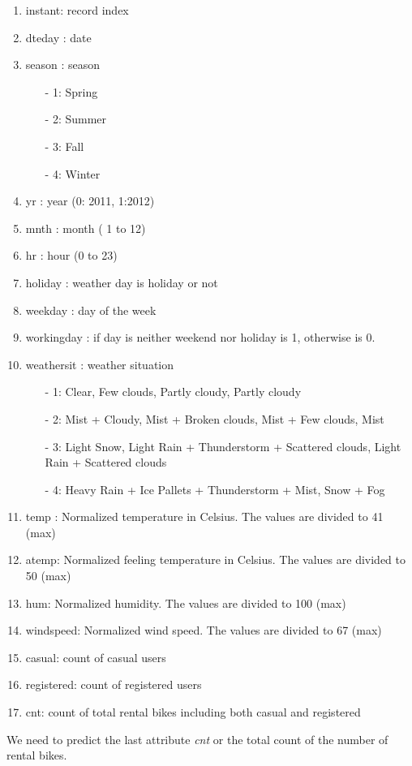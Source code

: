 \documentclass{article}
\begin{document}
\begin{enumerate}
    \item instant: record index
	\item dteday : date
    \item season : season 
        \begin{itemize}
            \item[-] 1: Spring
            \item[-] 2: Summer
            \item[-] 3: Fall 
            \item[-] 4: Winter 
        \end{itemize}
    \item yr : year (0: 2011, 1:2012)
	\item mnth : month ( 1 to 12)
	\item hr : hour (0 to 23)
	\item holiday : weather day is holiday or not 
	\item weekday : day of the week
	\item workingday : if day is neither weekend nor holiday is 1, otherwise is 0.
	\item weathersit : weather situation
	\begin{itemize}
		\item[-] 1: Clear, Few clouds, Partly cloudy, Partly cloudy
		\item[-] 2: Mist + Cloudy, Mist + Broken clouds, Mist + Few clouds, Mist
		\item[-] 3: Light Snow, Light Rain + Thunderstorm + Scattered clouds, Light Rain + Scattered clouds
		\item[-] 4: Heavy Rain + Ice Pallets + Thunderstorm + Mist, Snow + Fog
	\end{itemize}
	\item temp : Normalized temperature in Celsius. The values are divided to 41 (max)
	\item atemp: Normalized feeling temperature in Celsius. The values are divided to 50 (max)
	\item hum: Normalized humidity. The values are divided to 100 (max)
	\item windspeed: Normalized wind speed. The values are divided to 67 (max)
	\item casual: count of casual users
	\item registered: count of registered users
	\item cnt: count of total rental bikes including both casual and registered
\end{enumerate}
We need to predict the last attribute \textit{cnt} or the total count of the number of rental bikes. 
\end{document}

